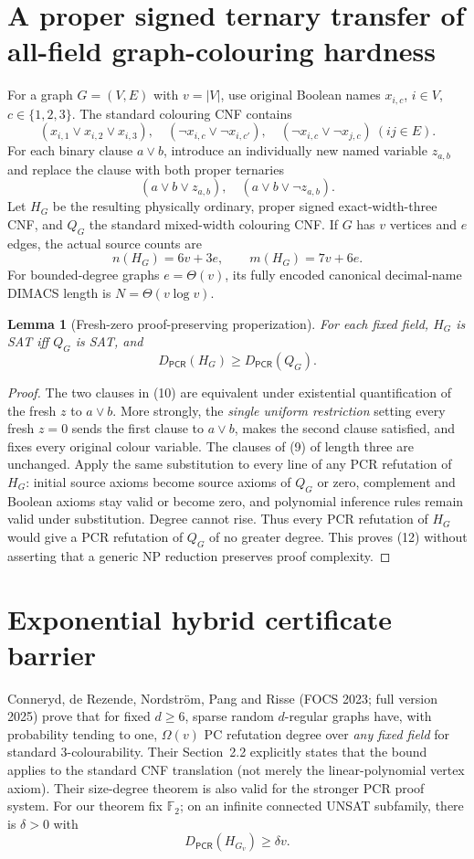 \documentclass[11pt]{article}
\newtheorem{lemma}[theorem]{Lemma}
\newcommand{\PCR}{\mathsf{PCR}}
\begin{document}
\section{A proper signed ternary transfer of all-field graph-colouring hardness}
For a graph $G=(V,E)$ with $v=|V|$, use original Boolean names $x_{i,c}$, $i\in V$, $c\in\{1,2,3\}$. The standard colouring CNF contains
\[ (x_{i,1}\vee x_{i,2}\vee x_{i,3}),\quad
 (\neg x_{i,c}\vee\neg x_{i,c'}),\quad
 (\neg x_{i,c}\vee\neg x_{j,c})\ (ij\in E).\tag{9}
\]
For each binary clause $a\vee b$, introduce an individually new named variable $z_{a,b}$ and replace the clause with both proper ternaries
\[(a\vee b\vee z_{a,b}),\quad(a\vee b\vee\neg z_{a,b}).\tag{10}\]
Let $H_G$ be the resulting physically ordinary, proper signed exact-width-three CNF, and $Q_G$ the standard mixed-width colouring CNF. If $G$ has $v$ vertices and $e$ edges, the actual source counts are
\[
 \boxed{n(H_G)=6v+3e,\qquad m(H_G)=7v+6e.}\tag{11}
\]
For bounded-degree graphs $e=\Theta(v)$, its fully encoded canonical decimal-name DIMACS length is $N=\Theta(v\log v)$.

\begin{lemma}[Fresh-zero proof-preserving properization]\label{lem:proper}
For each fixed field, \(H_G\) is SAT iff \(Q_G\) is SAT, and
\[\boxed{D_{\PCR}(H_G)\ge D_{\PCR}(Q_G).}\tag{12}\]
\end{lemma}
\begin{proof}
The two clauses in (10) are equivalent under existential quantification of the fresh $z$ to $a\vee b$. More strongly, the \emph{single uniform restriction} setting every fresh $z=0$ sends the first clause to $a\vee b$, makes the second clause satisfied, and fixes every original colour variable. The clauses of (9) of length three are unchanged. Apply the same substitution to every line of any PCR refutation of $H_G$: initial source axioms become source axioms of $Q_G$ or zero, complement and Boolean axioms stay valid or become zero, and polynomial inference rules remain valid under substitution. Degree cannot rise. Thus every PCR refutation of $H_G$ would give a PCR refutation of $Q_G$ of no greater degree. This proves (12) without asserting that a generic NP reduction preserves proof complexity.
\end{proof}

\section{Exponential hybrid certificate barrier}
Conneryd, de Rezende, Nordstr\"om, Pang and Risse (FOCS 2023; full version 2025) prove that for fixed $d\ge6$, sparse random $d$-regular graphs have, with probability tending to one, $\Omega(v)$ PC refutation degree over \emph{any fixed field} for standard 3-colourability. Their Section~2.2 explicitly states that the bound applies to the standard CNF translation (not merely the linear-polynomial vertex axiom). Their size-degree theorem is also valid for the stronger PCR proof system. For our theorem fix $\mathbb F_2$; on an infinite connected UNSAT subfamily, there is $\delta>0$ with
\[
 D_{\PCR}(H_{G_v})\ge \delta v.\tag{13}
\]
\end{document}
